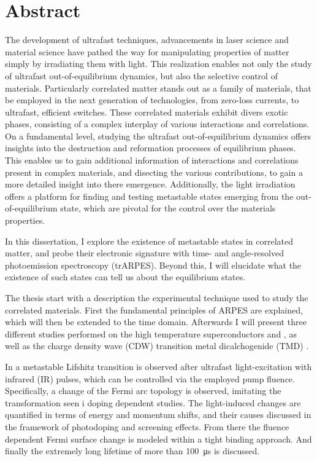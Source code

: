 

\cleardoublepage
\chapter*{Abstract}
The development of ultrafast techniques, advancements in laser science and material science have pathed the way for manipulating properties of matter simply by irradiating them with light.
This realization enables not only the study of ultrafast out-of-equilibrium dynamics, but also the selective control of materials.
Particularly correlated matter stands out as a family of materials, that be employed in the next generation of technologies, from zero-loss currents, to ultrafast, efficient switches.
These correlated materials exhibit divers exotic phases, consisting of a complex interplay of various interactions and correlations.
On a fundamental level, studying the ultrafast out-of-equilibrium dynamics offers insights into the destruction and reformation processes of equilibrium phases.
This enables us to gain additional information of interactions and correlations present in complex materials, and disecting the various contributions, to gain a more detailed insight into there emergence.
Additionally, the light irradiation offers a platform for finding and testing metastable states emerging from the out-of-equilibrium state, which are pivotal for the control over the materials properties.\hfill\break

In this dissertation, I explore the existence of metastable states in correlated matter, and probe their electronic signature with time- and angle-resolved photoemission spectroscopy (trARPES).
Beyond this, I will elucidate what the existence of such states can tell us about the equilibrium states. \hfill\break

The thesis start with a description the experimental technique used to study the correlated materials.
First the fundamental principles of ARPES are explained, which will then be extended to the time domain.
Afterwards I will present three different studies performed on the high temperature superconductors  and , as well as the charge density wave (CDW) transition metal dicalchogenide (TMD) .

In  a metastable Lifshitz transition is observed after ultrafast light-excitation with infrared (IR) pulses, which can be controlled via the employed pump fluence.
Specifically, a change of the Fermi arc topology is observed, imitating the transformation seen i doping dependent studies.
The light-induced changes are quantified in terms of energy and momentum shifts, and their causes discussed in the framework of photodoping and screening effects.
From there the fluence dependent Fermi surface change is modeled within a tight binding approach.
And finally the extremely long lifetime of more than \qty{100}{\micro\second} is discussed.

